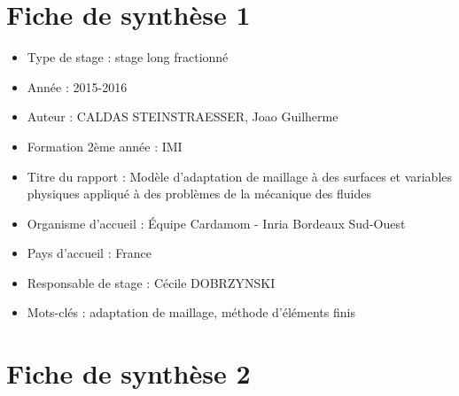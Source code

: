 \section*{Fiche de synthèse 1}

\begin{itemize}

\item Type de stage : stage long fractionné

\item Année : 2015-2016

\item Auteur : CALDAS STEINSTRAESSER, Joao Guilherme

\item Formation 2ème année : IMI

\item Titre du rapport : Modèle d'adaptation de maillage à des surfaces et variables physiques appliqué à des problèmes de la mécanique des fluides

\item Organisme d’accueil : Équipe Cardamom - Inria Bordeaux Sud-Ouest

\item Pays d’accueil : France

\item Responsable de stage : Cécile DOBRZYNSKI

\item Mots-clés : adaptation de maillage, méthode d'éléments finis

\end{itemize}

\cleardoublepage

\section*{Fiche de synthèse 2}


